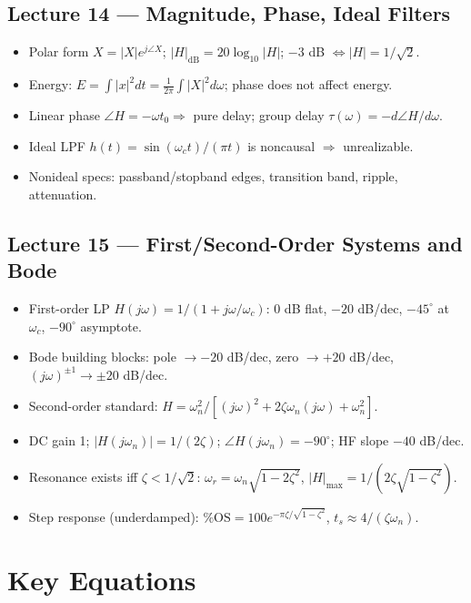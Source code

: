 \documentclass[11pt]{article}
\begin{document}
\subsection{Lecture 14 --- Magnitude, Phase, Ideal Filters}
\begin{itemize}[leftmargin=*]
  \item Polar form $X = |X|e^{j\angle X}$; $|H|_\text{dB}=20\log_{10}|H|$; $-3$ dB $\Leftrightarrow |H|=1/\sqrt{2}$.
  \item Energy: $E=\int|x|^2dt=\frac{1}{2\pi}\int|X|^2 d\omega$; phase does not affect energy.
  \item Linear phase $\angle H = -\omega t_0 \Rightarrow$ pure delay; group delay $\tau(\omega) = -d\angle H/d\omega$.
  \item Ideal LPF $h(t)=\sin(\omega_c t)/(\pi t)$ is noncausal $\Rightarrow$ unrealizable.
  \item Nonideal specs: passband/stopband edges, transition band, ripple, attenuation.
\end{itemize}

\subsection{Lecture 15 --- First/Second-Order Systems and Bode}
\begin{itemize}[leftmargin=*]
  \item First-order LP $H(j\omega)=1/(1+j\omega/\omega_c)$: $0$ dB flat, $-20$ dB/dec, $-45^\circ$ at $\omega_c$, $-90^\circ$ asymptote.
  \item Bode building blocks: pole $\to -20$ dB/dec, zero $\to +20$ dB/dec, $(j\omega)^{\pm 1}\to \pm 20$ dB/dec.
  \item Second-order standard: $H=\omega_n^2/[(j\omega)^2+2\zeta\omega_n(j\omega)+\omega_n^2]$.
  \item DC gain 1; $|H(j\omega_n)|=1/(2\zeta)$; $\angle H(j\omega_n) = -90^\circ$; HF slope $-40$ dB/dec.
  \item Resonance exists iff $\zeta<1/\sqrt{2}$: $\omega_r=\omega_n\sqrt{1-2\zeta^2}$, $|H|_{\max}=1/(2\zeta\sqrt{1-\zeta^2})$.
  \item Step response (underdamped): $\%\text{OS}=100 e^{-\pi\zeta/\sqrt{1-\zeta^2}}$, $t_s\approx 4/(\zeta\omega_n)$.
\end{itemize}

\section{Key Equations}
\end{document}
